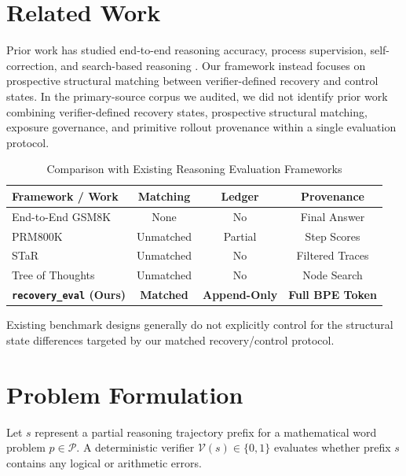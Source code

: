 \documentclass[conference]{IEEEtran}
\begin{document}
\section{Related Work}
Prior work has studied end-to-end reasoning accuracy, process supervision, self-correction, and search-based reasoning \cite{cobbe2021gsm8k, lightman2023process, zelikman2022star, snell2024scaling, wang2022selfconsistency, madaan2023selfrefine, huang2023large, kumar2024training, yao2023tree}. Our framework instead focuses on prospective structural matching between verifier-defined recovery and control states. In the primary-source corpus we audited, we did not identify prior work combining verifier-defined recovery states, prospective structural matching, exposure governance, and primitive rollout provenance within a single evaluation protocol.

\begin{table}[htbp]
\caption{Comparison with Existing Reasoning Evaluation Frameworks}
\label{tab:related_work}
\centering
\begin{tabularx}{\columnwidth}{Xccc}
\toprule
\textbf{Framework / Work} & \textbf{Matching} & \textbf{Ledger} & \textbf{Provenance} \\
\midrule
End-to-End GSM8K \cite{cobbe2021gsm8k} & None & No & Final Answer \\
PRM800K \cite{lightman2023process} & Unmatched & Partial & Step Scores \\
STaR \cite{zelikman2022star} & Unmatched & No & Filtered Traces \\
Tree of Thoughts \cite{yao2023tree} & Unmatched & No & Node Search \\
\textbf{\texttt{recovery\_eval} (Ours)} & \textbf{Matched} & \textbf{Append-Only} & \textbf{Full BPE Token} \\
\bottomrule
\end{tabularx}
\end{table}

Existing benchmark designs generally do not explicitly control for the structural state differences targeted by our matched recovery/control protocol.

\section{Problem Formulation}
Let $s$ represent a partial reasoning trajectory prefix for a mathematical word problem $p \in \mathcal{P}$. A deterministic verifier $\mathcal{V}(s) \in \{0, 1\}$ evaluates whether prefix $s$ contains any logical or arithmetic errors.
\end{document}
